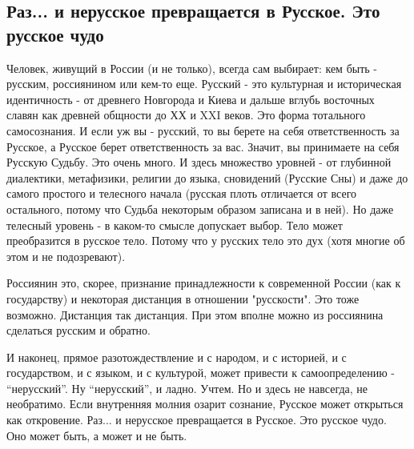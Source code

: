 
 
 
 
 
\subsection{Раз...  и нерусское превращается в Русское. Это русское чудо}
\label{sec:05_05_2021.fb.dugin_aleksandr.1.russkie}

Человек, живущий в России (и не только), всегда сам выбирает: кем быть -
русским, россиянином или кем-то еще. Русский - это культурная и историческая
идентичность - от древнего Новгорода и Киева и дальше вглубь восточных славян
как древней общности до ХХ и XXI веков. Это форма тотального самосознания. И
если уж вы - русский, то вы берете на себя ответственность за Русское, а
Русское берет ответственность за вас. Значит, вы принимаете на себя Русскую
Судьбу. Это очень много. И здесь множество уровней - от глубинной диалектики,
метафизики, религии до языка, сновидений (Русские Сны) и даже до самого
простого и телесного начала (русская плоть отличается от всего остального,
потому что Судьба некоторым образом записана и в ней). Но даже телесный уровень
- в каком-то смысле допускает выбор. Тело может преобразится в русское тело.
Потому что у русских тело это дух (хотя многие об этом и не подозревают).

Россиянин это, скорее, признание принадлежности к современной России (как к
государству) и некоторая дистанция в отношении "русскости". Это тоже возможно.
Дистанция так дистанция. При этом вполне можно из россиянина сделаться русским
и обратно. 

И наконец, прямое разотождествление и с народом, и с историей, и с
государством, и с языком, и с культурой, может привести к самоопределению -
\enquote{нерусский}. Ну \enquote{нерусский}, и ладно. Учтем. Но и здесь не навсегда, не
необратимо. Если внутренняя молния озарит сознание, Русское может открыться как
откровение. Раз...  и нерусское превращается в Русское. Это русское чудо. Оно
может быть, а может и не быть.

